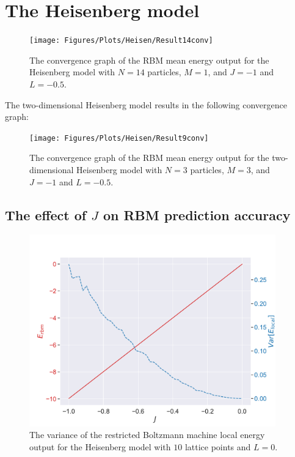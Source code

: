 \section{The Heisenberg model}


\begin{figure}[H]
  \begin{center}
    \texttt{[image: Figures/Plots/Heisen/Result14conv]}
  \end{center}
  \caption{The convergence graph of the RBM mean energy output for the Heisenberg model with $N = 14$ particles, $M=1$, and $J=-1$ and $L=-0.5$.}
\end{figure}

The two-dimensional Heisenberg model results in the following convergence graph:

\begin{figure}[H]
  \begin{center}
    \texttt{[image: Figures/Plots/Heisen/Result9conv]}
  \end{center}
  \caption{The convergence graph of the RBM mean energy output for the two-dimensional Heisenberg model with $N = 3$ particles, $M=3$, and $J=-1$ and $L=-0.5$.}
\end{figure}

\subsection{The effect of \texorpdfstring{$J$}{J} on RBM prediction accuracy}

\begin{figure}[H]
  \begin{center}
    \includegraphics[width=0.95\textwidth]{Figures/Plots/Heisen/[J][-1.0-0.0][e=500][n=10][N=10][M=1][L=0]}
  \end{center}
  \caption{The variance of the restricted Boltzmann machine local energy output for the Heisenberg model with $10$ lattice points and $L=0$.}
\end{figure}


